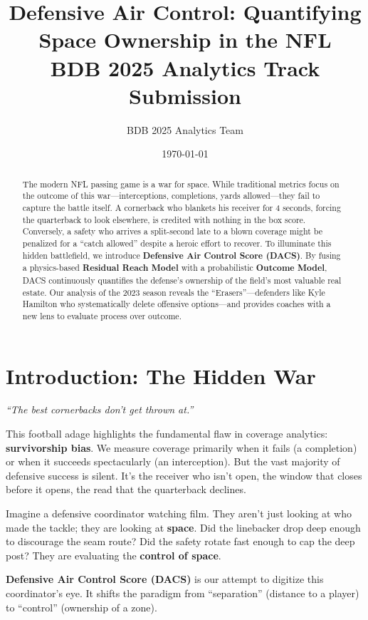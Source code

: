 \documentclass{article}
\title{Defensive Air Control: Quantifying Space Ownership in the NFL \\ \large BDB 2025 Analytics Track Submission}
\author{BDB 2025 Analytics Team}
\date{\today}
\begin{document}
\maketitle

\begin{abstract}
The modern NFL passing game is a war for space. While traditional metrics focus on the outcome of this war—interceptions, completions, yards allowed—they fail to capture the battle itself. A cornerback who blankets his receiver for 4 seconds, forcing the quarterback to look elsewhere, is credited with nothing in the box score. Conversely, a safety who arrives a split-second late to a blown coverage might be penalized for a ``catch allowed'' despite a heroic effort to recover. To illuminate this hidden battlefield, we introduce \textbf{Defensive Air Control Score (DACS)}. By fusing a physics-based \textbf{Residual Reach Model} with a probabilistic \textbf{Outcome Model}, DACS continuously quantifies the defense's ownership of the field's most valuable real estate. Our analysis of the 2023 season reveals the ``Erasers''—defenders like Kyle Hamilton who systematically delete offensive options—and provides coaches with a new lens to evaluate process over outcome.
\end{abstract}

\section{Introduction: The Hidden War}

\textit{``The best cornerbacks don't get thrown at.''}

This football adage highlights the fundamental flaw in coverage analytics: \textbf{survivorship bias}. We measure coverage primarily when it fails (a completion) or when it succeeds spectacularly (an interception). But the vast majority of defensive success is silent. It's the receiver who isn't open, the window that closes before it opens, the read that the quarterback declines.

Imagine a defensive coordinator watching film. They aren't just looking at who made the tackle; they are looking at \textbf{space}. Did the linebacker drop deep enough to discourage the seam route? Did the safety rotate fast enough to cap the deep post? They are evaluating the \textbf{control of space}.

\textbf{Defensive Air Control Score (DACS)} is our attempt to digitize this coordinator's eye. It shifts the paradigm from ``separation'' (distance to a player) to ``control'' (ownership of a zone). 
\end{document}
